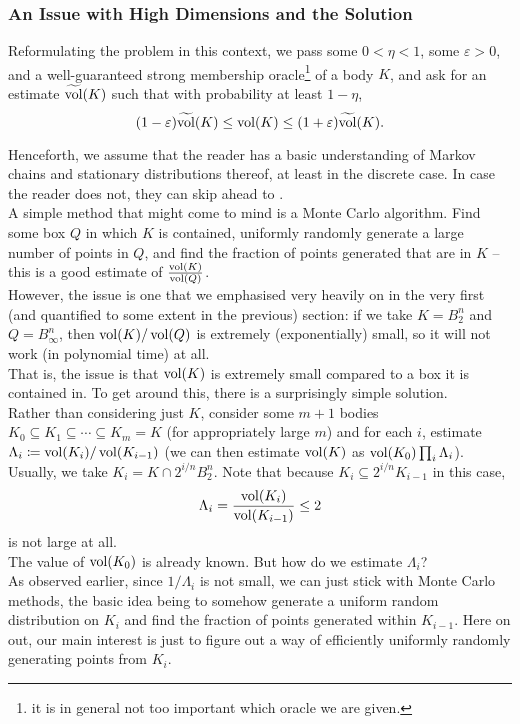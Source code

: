\subsubsection{An Issue with High Dimensions and the Solution}

Reformulating the problem in this context, we pass some $0<\eta<1$, some $\varepsilon>0$, and a well-guaranteed strong membership oracle\footnote{it is in general not too important which oracle we are given.} of a body $K$, and ask for an estimate $\widetilde{\operatorname{vol}}(K)$ such that with probability at least $1-\eta$,
\[ (1-\varepsilon)\widetilde{\operatorname{vol}}(K) \leq \operatorname{vol}(K) \leq (1+\varepsilon)\widetilde{\operatorname{vol}}(K). \]

Henceforth, we assume that the reader has a basic understanding of Markov chains and stationary distributions thereof, at least in the discrete case. In case the reader does not, they can skip ahead to .\\

A simple method that might come to mind is a Monte Carlo algorithm. Find some box $Q$ in which $K$ is contained, uniformly randomly generate a large number of points in $Q$, and find the fraction of points generated that are in $K$ -- this is a good estimate of $\frac{\operatorname{vol}(K)}{\operatorname{vol}(Q)}$.\\
However, the issue is one that we emphasised very heavily on in the very first (and quantified to some extent in the previous) section: if we take $K=B_2^n$ and $Q=B_\infty^n$, then $\operatorname{vol}(K)/\operatorname{vol}(Q)$ is extremely (exponentially) small, so it will not work (in polynomial time) at all.\\

That is, the issue is that $\operatorname{vol}(K)$ is extremely small compared to a box it is contained in. To get around this, there is a surprisingly simple solution.\\

Rather than considering just $K$, consider some $m+1$ bodies $K_0\subseteq K_1\subseteq \cdots \subseteq K_m=K$ (for appropriately large $m$) and for each $i$, estimate $\Lambda_i \coloneqq \operatorname{vol}(K_i)/\operatorname{vol}(K_{i-1})$ (we can then estimate $\operatorname{vol}(K)$ as $\operatorname{vol}(K_0)\prod_i\Lambda_i$).\\
Usually, we take $K_i = K \cap 2^{i/n}B_2^n$. Note that because $K_{i}\subseteq 2^{i/n}K_{i-1}$ in this case,
\[ \Lambda_i = \frac{\operatorname{vol}(K_i)}{\operatorname{vol}(K_{i-1})} \leq 2 \]
is not large at all.\\
The value of $\operatorname{vol}(K_0)$ is already known. But how do we estimate $\Lambda_i$?\\
As observed earlier, since $1/\Lambda_i$ is not small, we can just stick with Monte Carlo methods, the basic idea being to somehow generate a uniform random distribution on $K_i$ and find the fraction of points generated within $K_{i-1}$. Here on out, our main interest is just to figure out a way of efficiently uniformly randomly generating points from $K_i$.\\

